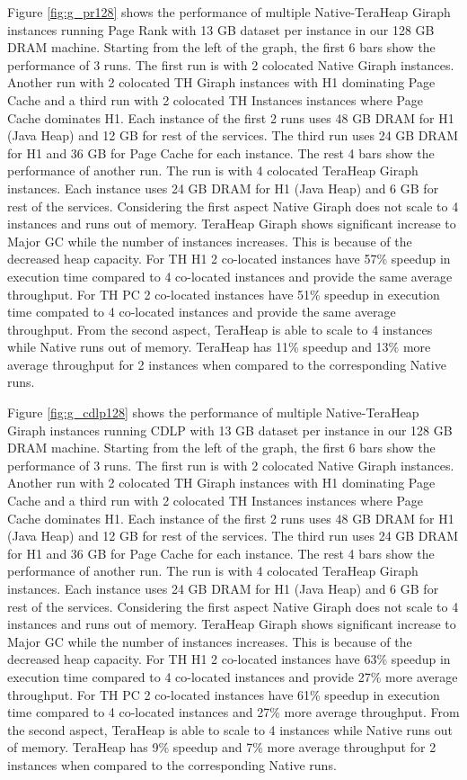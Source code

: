 Figure \ref{fig:g_pr128} shows the performance of multiple
Native-TeraHeap Giraph instances running Page Rank with 13 GB
dataset per instance in our 128 GB DRAM machine.
Starting from the left of the graph, the first 6 bars show the
performance of 3 runs. The first run is with 2 colocated Native Giraph instances.
Another run with 2 colocated TH Giraph instances with H1 dominating Page Cache
and a third run with 2 colocated TH Instances instances where Page Cache dominates H1.
Each instance of the first 2 runs uses 48 GB DRAM for H1 (Java Heap) and 12 GB for rest of the services.
The third run uses 24 GB DRAM for H1 and 36 GB for Page Cache for each instance.
The rest 4 bars show the performance of another run. The run is with 4 colocated TeraHeap Giraph instances.
Each instance uses 24 GB DRAM for H1 (Java Heap) and 6 GB for rest of the services.
Considering the first aspect Native Giraph does not scale to 4 instances and runs out of memory. TeraHeap Giraph shows significant increase to Major GC while the number of instances increases. This is because of the decreased heap capacity. For TH H1 2 co-located instances have 57\% speedup in execution time compared to 4 co-located instances and provide the same average throughput. For TH PC 2 co-located instances have 51\% speedup in execution time compated to 4 co-located instances and provide the same average throughput.
From the second aspect, TeraHeap is able to scale to 4 instances while Native runs out of memory. TeraHeap has 11\% speedup and 13\% more average throughput for 2 instances when compared to the corresponding Native runs.

Figure \ref{fig:g_cdlp128} shows the performance of multiple
Native-TeraHeap Giraph instances running CDLP with 13 GB
dataset per instance in our 128 GB DRAM machine.
Starting from the left of the graph, the first 6 bars show the
performance of 3 runs. The first run is with 2 colocated Native Giraph instances.
Another run with 2 colocated TH Giraph instances with H1 dominating Page Cache
and a third run with 2 colocated TH Instances instances where Page Cache dominates H1.
Each instance of the first 2 runs uses 48 GB DRAM for H1 (Java Heap) and 12 GB for rest of the services.
The third run uses 24 GB DRAM for H1 and 36 GB for Page Cache for each instance.
The rest 4 bars show the performance of another run. The run is with 4 colocated TeraHeap Giraph instances.
Each instance uses 24 GB DRAM for H1 (Java Heap) and 6 GB for rest of the services.
Considering the first aspect Native Giraph does not scale to 4 instances and runs out of memory. TeraHeap Giraph shows significant increase to Major GC while the number of instances increases. This is because of the decreased heap capacity. For TH H1 2 co-located instances have 63\% speedup in execution time compared to 4 co-located instances and provide 27\% more average throughput. For TH PC 2 co-located instances have 61\% speedup in execution time compared to 4 co-located instances and 27\% more average throughput. From the second aspect, TeraHeap is able to scale to 4 instances while Native runs out of memory. TeraHeap has 9\% speedup and 7\% more average throughput for 2 instances when compared to the corresponding Native runs.

